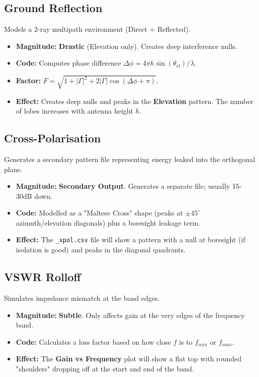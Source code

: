 \documentclass[11pt,a4paper]{article}
\begin{document}
\subsection{Ground Reflection}
Models a 2-ray multipath environment (Direct + Reflected).
\begin{itemize}
    \item \textbf{Magnitude:} \textbf{Drastic} (Elevation only). Creates deep interference nulls.
    \item \textbf{Code:} Computes phase difference $\Delta \phi = 4\pi h \sin(\theta_{el}) / \lambda$.
    \item \textbf{Factor:} $F = \sqrt{1 + |\Gamma|^2 + 2|\Gamma|\cos(\Delta \phi + \pi)}$.
    \item \textbf{Effect:} Creates deep nulls and peaks in the \textbf{Elevation} pattern. The number of lobes increases with antenna height $h$.
\end{itemize}

\subsection{Cross-Polarisation}
Generates a secondary pattern file representing energy leaked into the orthogonal plane.
\begin{itemize}
    \item \textbf{Magnitude:} \textbf{Secondary Output}. Generates a separate file; usually 15-30dB down.
    \item \textbf{Code:} Modelled as a "Maltese Cross" shape (peaks at $\pm 45^\circ$ azimuth/elevation diagonals) plus a boresight leakage term.
    \item \textbf{Effect:} The \texttt{\_xpol.csv} file will show a pattern with a null at boresight (if isolation is good) and peaks in the diagonal quadrants.
\end{itemize}

\subsection{VSWR Rolloff}
Simulates impedance mismatch at the band edges.
\begin{itemize}
    \item \textbf{Magnitude:} \textbf{Subtle}. Only affects gain at the very edges of the frequency band.
    \item \textbf{Code:} Calculates a loss factor based on how close $f$ is to $f_{min}$ or $f_{max}$.
    \item \textbf{Effect:} The \textbf{Gain vs Frequency} plot will show a flat top with rounded "shoulders" dropping off at the start and end of the band.
\end{itemize}
\end{document}
